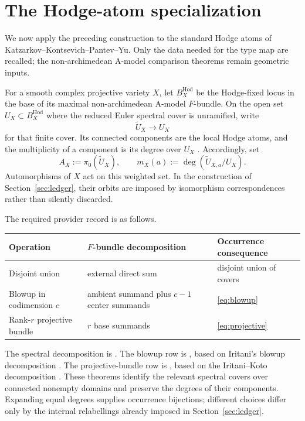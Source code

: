 \section{The Hodge-atom specialization}
\label{sec:hodge}

We now apply the preceding construction to the standard Hodge atoms of
Katzarkov--Kontsevich--Pantev--Yu.  Only the data needed for the type map are
recalled; the non-archimedean A-model comparison theorems remain geometric
inputs.

For a smooth complex projective variety $X$, let $B_X^{\mathrm{Hod}}$ be
the Hodge-fixed locus in the base of its maximal non-archimedean A-model
$F$-bundle.  On the open set $U_X\subset B_X^{\mathrm{Hod}}$ where the
reduced Euler spectral cover is unramified, write
\[
 \widetilde U_X\longrightarrow U_X
 \tag{3.1}\label{eq:hodge-cover}
\]
for that finite cover.  Its connected components are the local Hodge atoms,
and the multiplicity of a component is its degree over $U_X$
\cite[Definition~5.10 and Section~5.4]{KKPY}.  Accordingly, set
\[
 A_X:=\pi_0(\widetilde U_X),
 \qquad
 m_X(a):=\deg(\widetilde U_{X,a}/U_X).
 \tag{3.2}\label{eq:hodge-occurrences}
\]
Automorphisms of $X$ act on this weighted set.  In the construction of
Section~\ref{sec:ledger}, their orbits are imposed by isomorphism
correspondences rather than silently discarded.

The required provider record is as follows.
\begin{center}
\begin{tabular}{@{}>{\raggedright\arraybackslash}p{}
                    >{\raggedright\arraybackslash}p{}
                    >{\raggedright\arraybackslash}p{}@{}}
\toprule
Operation & $F$-bundle decomposition & Occurrence consequence \\
\midrule
Disjoint union & external direct sum & disjoint union of covers \\
Blowup in codimension $c$ & ambient summand plus $c-1$ center summands &
  \eqref{eq:blowup} \\
Rank-$r$ projective bundle & $r$ base summands &
  \eqref{eq:projective} \\
\bottomrule
\end{tabular}
\end{center}
The spectral decomposition is \cite[Theorem~4.1]{KKPY}.  The blowup row is
\cite[Theorem~4.5]{KKPY}, based on Iritani's blowup decomposition
\cite[Theorem~5.18]{Iritani}.  The projective-bundle row is
\cite[Theorem~4.11]{KKPY}, based on the Iritani--Koto decomposition
\cite[Theorem~5.1]{IritaniKoto}.  These theorems identify the relevant
spectral covers over connected nonempty domains and preserve the degrees of
their components.  Expanding equal degrees supplies occurrence bijections;
different choices differ only by the internal relabellings already imposed in
Section~\ref{sec:ledger}.

